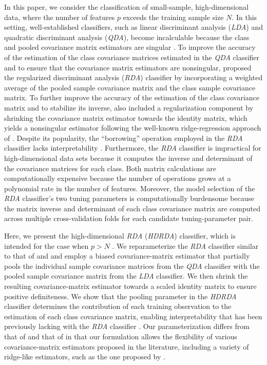 \documentclass[]{interact}\usepackage[]{graphicx}\usepackage[]{color}
\begin{document}
In this paper, we consider the classification of small-sample, high-dimensional
data, where the number of features $p$ exceeds the training sample size $N$. In
this setting, well-established classifiers, such as linear discriminant analysis
(\emph{LDA}) and quadratic discriminant analysis (\emph{QDA}), become
incalculable because the class and pooled covariance matrix estimators are
singular \citep*{Murphy:2012uq, Bouveyron:2007gx, Mkhadri:1997gy}. To improve
the accuracy of the estimation of the class covariance matrices estimated in the
\emph{QDA} classifier and to ensure that the covariance matrix estimators are
nonsingular, \cite{Friedman:1989tm} proposed the regularized discriminant
analysis (\emph{RDA}) classifier by incorporating a weighted average of the
pooled sample covariance matrix and the class sample covariance matrix. To
further improve the accuracy of the estimation of the class covariance matrix
and to stabilize its inverse, \cite{Friedman:1989tm} also included a
regularization component by shrinking the covariance matrix estimator towards
the identity matrix, which yields a nonsingular estimator following the
well-known ridge-regression approach of \cite{Hoerl:1970cd}. Despite its
popularity, the ``borrowing'' operation employed in the \emph{RDA} classifier
lacks interpretability \citep{Bensmail:1996fw}. Furthermore, the \emph{RDA}
classifier is impractical for high-dimensional data sets because it computes the
inverse and determinant of the covariance matrices for each class. Both matrix
calculations are computationally expensive because the number of operations
grows at a polynomial rate in the number of features. Moreover, the model
selection of the \emph{RDA} classifier's two tuning parameters is
computationally burdensome because the matrix inverse and determinant of each
class covariance matrix are computed across multiple cross-validation folds for
each candidate tuning-parameter pair.

Here, we present the high-dimensional \emph{RDA} (\emph{HDRDA}) classifier,
which is intended for the case when $p > N$ . We reparameterize the \emph{RDA}
classifier similar to that of \cite*{Hastie:2008dt} and \cite{Halbe:2007ea} and
employ a biased covariance-matrix estimator that partially pools the individual
sample covariance matrices from the \emph{QDA} classifier with the pooled sample
covariance matrix from the \emph{LDA} classifier. We then shrink the resulting
covariance-matrix estimator towards a scaled identity matrix to ensure positive
definiteness. We show that the pooling parameter in the \emph{HDRDA} classifier
determines the contribution of each training observation to the estimation of
each class covariance matrix, enabling interpretability that has been previously
lacking with the \emph{RDA} classifier \citep{Bensmail:1996fw}. Our
parameterization differs from that of \cite*{Hastie:2008dt} and that of
\cite{Halbe:2007ea} in that our formulation allows the flexibility of various
covariance-matrix estimators proposed in the literature, including a variety of
ridge-like estimators, such as the one proposed by \cite{Srivastava:2007ww}.
\end{document}
